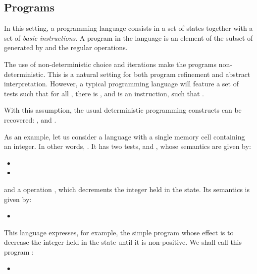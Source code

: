 \documentclass[]{llncs}
\begin{document}
\subsection{Programs}\label{latex_lib_label_1}
\par
In this setting, a programming language consists in a set  of states together with a set  of \emph{basic instructions}. A program in the language  is an element of the subset of  generated by  and the regular operations.
\par
The use of non-deterministic choice and iterations make the programs non-deterministic. This is a natural setting for both program refinement and abstract interpretation. However, a typical programming language will feature a set of tests  such that for all , there is , and  is an instruction, such that .
\par
With this assumption, the usual deterministic programming constructs can be recovered: , and .
\par
\par
\begin{example}
    As an example, let us consider a language with a single memory cell containing an integer. In other words, . It has two tests,  and , whose semantics are given by:
    \begin{itemize}
      \item 
      \item 
    \end{itemize}
    and a operation , which decrements the integer held in the state. Its semantics is given by:
    \begin{itemize}
      \item 
    \end{itemize}
\par
This language expresses, for example, the simple program whose effect is to decrease the integer held in the state until it is non-positive. We shall call this program :
    \begin{itemize}
      \item 
    \end{itemize}
  \end{example}
\par
\par
\end{document}
